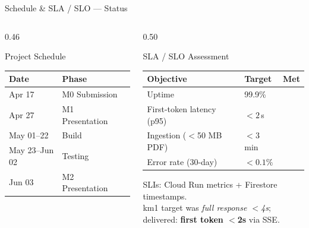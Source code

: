\documentclass[aspectratio=169]{beamer}
\newcommand{\cmark}{\textcolor{OK}{\checkmark}}
\begin{document}
\begin{frame}[t,shrink=3]{Schedule \& SLA / SLO — Status}
  \begin{columns}[t]
    \begin{column}{0.46\textwidth}
      \begin{block}{Project Schedule}
        {\footnotesize\renewcommand{\arraystretch}{1.3}
        \begin{tabularx}{\linewidth}{@{}lXc@{}}
          \toprule
          \textbf{Date} & \textbf{Phase} & \\
          \midrule
          Apr 17        & M0 Submission    & \cmark \\
          Apr 27        & M1 Presentation  & \cmark \\
          May 01--22    & Build            & \cmark \\
          May 23--Jun 02 & Testing         & \cmark \\
          Jun 03        & M2 Presentation  & \cmark \\
          \bottomrule
        \end{tabularx}}
      \end{block}
    \end{column}
    \begin{column}{0.50\textwidth}
      \begin{block}{SLA / SLO Assessment}
        {\footnotesize\renewcommand{\arraystretch}{1.3}
        \begin{tabularx}{\linewidth}{@{}Xlc@{}}
          \toprule
          \textbf{Objective} & \textbf{Target} & \textbf{Met} \\
          \midrule
          Uptime                    & 99.9\%       & \cmark \\
          First-token latency (p95) & $<\!2\,$s    & \cmark \\
          Ingestion ($<$50 MB PDF)  & $<\!3\,$min  & \cmark \\
          Error rate (30-day)       & $<\!0.1\%$   & \cmark \\
          \bottomrule
        \end{tabularx}}
      \end{block}
      \vspace{0.15cm}
      {\footnotesize\color{MUT}
        SLIs: Cloud Run metrics + Firestore timestamps.\\
        km1 target was \textit{full response $<$4s};\\
        delivered: \textbf{first token $<$2s} via SSE.}
    \end{column}
  \end{columns}
\end{frame}
\end{document}
